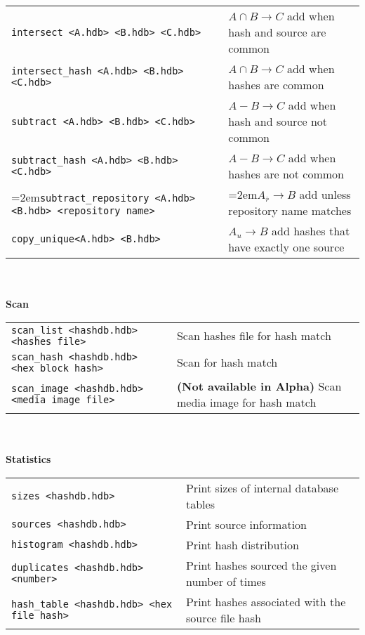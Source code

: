 \begin{footnotesize}
\begin{tabular}{p{3.6 in} p{3.0 in}}
\texttt{intersect <A.hdb> <B.hdb> <C.hdb>} & $A \cap B \rightarrow C$ add when hash and source are common\\
\texttt{intersect\_hash <A.hdb> <B.hdb> <C.hdb>} & $A \cap B \rightarrow C$ add when hashes are common\\
\texttt{subtract <A.hdb> <B.hdb> <C.hdb>} & $A - B \rightarrow C$ add when hash and source not common\\
\texttt{subtract\_hash <A.hdb> <B.hdb> <C.hdb>} & $A - B \rightarrow C$ add when hashes are not common\\
\hangindent=2em\texttt{subtract\_repository <A.hdb> <B.hdb> <repository name>} & \hangindent=2em$A_{\overline{r}} \rightarrow B$ add unless repository name matches\\
\texttt{copy\_unique<A.hdb> <B.hdb>} & $A_u \rightarrow B$ add hashes that have exactly one source\\
\end{tabular}
\\
\\
\textbf{Scan} \\
\begin{tabular}{p{3.6 in} p{3.0 in}}
\texttt{scan\_list <hashdb.hdb> <hashes file>} & Scan hashes file for hash match \\
\texttt{scan\_hash <hashdb.hdb> <hex block hash>} & Scan for hash match \\
\texttt{scan\_image <hashdb.hdb> <media image file>} & \textbf{(Not available in Alpha)} Scan media image for hash match \\
\end{tabular}
\\
\\
\textbf{Statistics}\\
\begin{tabular}{p{3.6 in} p{3.0 in}}
\texttt{sizes <hashdb.hdb>} & Print sizes of internal database tables \\
\texttt{sources <hashdb.hdb>} & Print source information \\
\texttt{histogram <hashdb.hdb>} & Print hash distribution \\
\texttt{duplicates <hashdb.hdb> <number>} & Print hashes sourced the given number of times \\
\texttt{hash\_table <hashdb.hdb> <hex file hash>} & Print hashes associated with the source file hash\\
\end{tabular}
\\
\\

\end{footnotesize}
